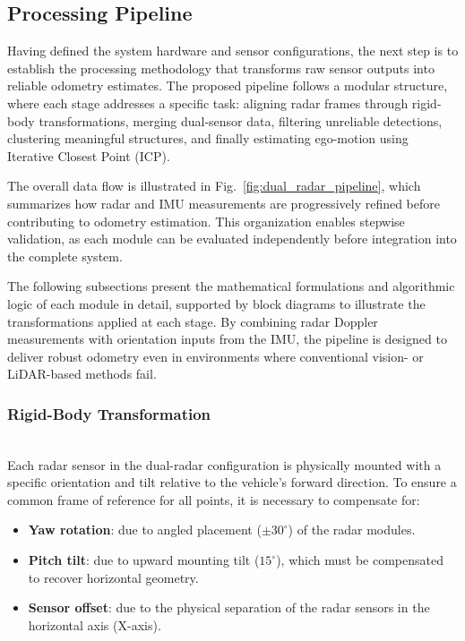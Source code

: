 \subsection{Processing Pipeline}

Having defined the system hardware and sensor configurations, the next step is to establish the processing methodology that transforms raw sensor outputs into reliable odometry estimates.  
The proposed pipeline follows a modular structure, where each stage addresses a specific task: aligning radar frames through rigid-body transformations, merging dual-sensor data, filtering unreliable detections, clustering meaningful structures, and finally estimating ego-motion using Iterative Closest Point (ICP).  

The overall data flow is illustrated in Fig.~\ref{fig:dual_radar_pipeline}, which summarizes how radar and IMU measurements are progressively refined before contributing to odometry estimation.  
This organization enables stepwise validation, as each module can be evaluated independently before integration into the complete system.  

The following subsections present the mathematical formulations and algorithmic logic of each module in detail, supported by block diagrams to illustrate the transformations applied at each stage.  
By combining radar Doppler measurements with orientation inputs from the IMU, the pipeline is designed to deliver robust odometry even in environments where conventional vision- or LiDAR-based methods fail.

\vspace{0.5em}
\subsubsection{Rigid-Body Transformation}  
\hfill 
\\
Each radar sensor in the dual-radar configuration is physically mounted with a specific orientation and tilt relative to the vehicle's forward direction. 
To ensure a common frame of reference for all points, it is necessary to compensate for:

\begin{itemize}
    \item \textbf{Yaw rotation}: due to angled placement ($\pm30^\circ$) of the radar modules.
    \item \textbf{Pitch tilt}: due to upward mounting tilt ($15^\circ$), which must be compensated to recover horizontal geometry.
    \item \textbf{Sensor offset}: due to the physical separation of the radar sensors in the horizontal axis (X-axis).
\end{itemize}

